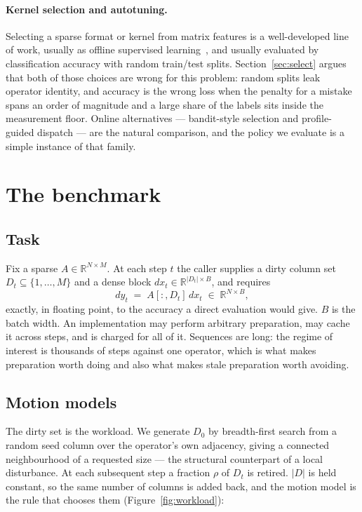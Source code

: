 \documentclass{article}
\begin{document}
\paragraph{Kernel selection and autotuning.}
Selecting a sparse format or kernel from matrix features is a well-developed
line of work, usually as offline supervised learning~\citep{li2013,
sedaghati2015, zhao2018}, and usually evaluated by classification accuracy with
random train/test splits. Section~\ref{sec:select} argues that both of those
choices are wrong for this problem: random splits leak operator identity, and
accuracy is the wrong loss when the penalty for a mistake spans an order of
magnitude and a large share of the labels sits inside the measurement floor.
Online alternatives --- bandit-style selection and profile-guided dispatch ---
are the natural comparison, and the policy we evaluate is a simple instance of
that family.

\section{The benchmark}
\label{sec:bench}

\subsection{Task}

Fix a sparse $A \in \mathbb{R}^{N\times M}$. At each step $t$ the caller
supplies a dirty column set $D_t \subseteq \{1,\dots,M\}$ and a dense block
$dx_t \in \mathbb{R}^{|D_t| \times B}$, and requires
\[
  dy_t \;=\; A[:,D_t]\,dx_t \;\in\; \mathbb{R}^{N\times B},
\]
exactly, in floating point, to the accuracy a direct evaluation would give. $B$
is the batch width. An implementation may perform arbitrary preparation, may
cache it across steps, and is charged for all of it. Sequences are long: the
regime of interest is thousands of steps against one operator, which is what
makes preparation worth doing and also what makes stale preparation worth
avoiding.

\subsection{Motion models}
\label{sec:motion}

The dirty set is the workload. We generate $D_0$ by breadth-first search from a
random seed column over the operator's own adjacency, giving a connected
neighbourhood of a requested size --- the structural counterpart of a local
disturbance. At each subsequent step a fraction $\rho$ of $D_t$ is retired.
$|D|$ is held constant, so the same number of columns is added back, and the
motion model is the rule that chooses them (Figure~\ref{fig:workload}):
\end{document}
